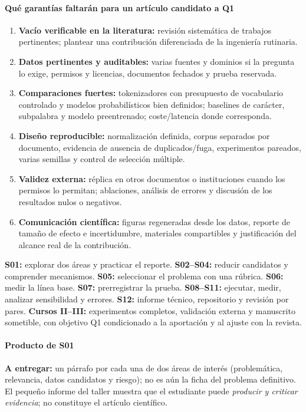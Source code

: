\paragraph{Qué garantías faltarán para un artículo candidato a Q1}
\begin{enumerate}
\item \textbf{Vacío verificable en la literatura:} revisión sistemática de trabajos
pertinentes; plantear una contribución diferenciada de la ingeniería rutinaria.
\item \textbf{Datos pertinentes y auditables:} varias fuentes y dominios si la
pregunta lo exige, permisos y licencias, documentos fechados y prueba reservada.
\item \textbf{Comparaciones fuertes:} tokenizadores con presupuesto de vocabulario
controlado y modelos probabilísticos bien definidos; baselines de carácter,
subpalabra y modelo preentrenado; coste/latencia donde corresponda.
\item \textbf{Diseño reproducible:} normalización definida, corpus separados por
documento, evidencia de ausencia de duplicados/fuga, experimentos pareados,
varias semillas y control de selección múltiple.
\item \textbf{Validez externa:} réplica en otros documentos o instituciones
cuando los permisos lo permitan; ablaciones, análisis de errores y discusión
de los resultados nulos o negativos.
\item \textbf{Comunicación científica:} figuras regeneradas desde los datos,
reporte de tamaño de efecto e incertidumbre, materiales compartibles y
justificación del alcance real de la contribución.
\end{enumerate}
\begin{puente}
\textbf{S01:} explorar dos áreas y practicar el reporte. \textbf{S02--S04:}
reducir candidatos y comprender mecanismos. \textbf{S05:} seleccionar el
problema con una rúbrica. \textbf{S06:} medir la línea base. \textbf{S07:}
prerregistrar la prueba. \textbf{S08--S11:} ejecutar, medir, analizar
sensibilidad y errores. \textbf{S12:} informe técnico, repositorio y revisión
por pares. \textbf{Cursos II--III:} experimentos completos, validación
externa y manuscrito sometible, con objetivo Q1 condicionado a la
aportación y al ajuste con la revista.
\end{puente}
\paragraph{Producto de S01}
\textbf{A entregar:} un párrafo por cada una de dos áreas de interés
(problemática, relevancia, datos candidatos y riesgo); no es aún la ficha
del problema definitivo. El pequeño informe del taller muestra que el
estudiante puede \emph{producir y criticar evidencia}; no constituye el
artículo científico.

